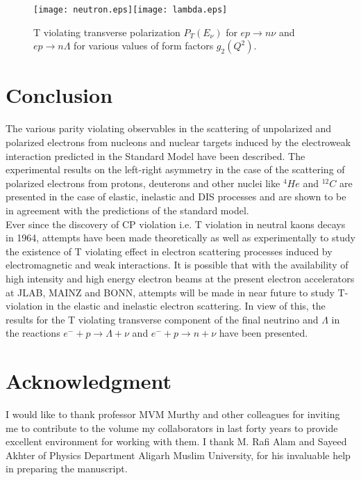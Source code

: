 \begin{figure}
 \begin{center}
   \hspace{-1cm}
   \texttt{[image: neutron.eps]}\texttt{[image: lambda.eps]}
  \caption{T violating transverse polarization $P_T(E_\nu)$ for $ep\rightarrow n\nu$ and $ep\rightarrow n\Lambda$ for various values of form factors $g_2(Q^2)$.}\label{neutron:lamda}
   \end{center}
 \end{figure}


\section{Conclusion} 
The various parity violating observables in the scattering of unpolarized and polarized electrons from nucleons and nuclear targets induced  by the electroweak interaction predicted in the Standard Model have been described. The experimental results on the left-right asymmetry in the case of the scattering of polarized electrons from protons, deuterons  and other nuclei like $^4{He}$ and $^{12}{C}$ are presented in the case of elastic, inelastic and DIS processes and are shown to be in agreement with the predictions of the standard model.\\

Ever since the discovery of CP violation i.e. T violation in neutral kaons decays in 1964, attempts have been made theoretically as well as experimentally to study the existence of T violating effect  in electron scattering processes induced by electromagnetic and weak interactions. It is possible that with the availability of high intensity and high energy electron beams at the present electron accelerators at JLAB, MAINZ and BONN, attempts will be made in near future to study T-violation in the elastic and inelastic electron scattering. In view of this, the results for the T violating transverse component of the final neutrino and $\Lambda$ in the reactions $e^-+p\rightarrow \Lambda+\nu$ and $e^-+p\rightarrow n+\nu$ have been presented.
    

\section{Acknowledgment}

I would like to thank professor MVM Murthy and other colleagues for inviting me to contribute to the volume my collaborators in last forty years to provide excellent environment for working with them. I thank M. Rafi Alam and Sayeed Akhter of Physics Department Aligarh Muslim University, for his invaluable help in preparing the manuscript. 

